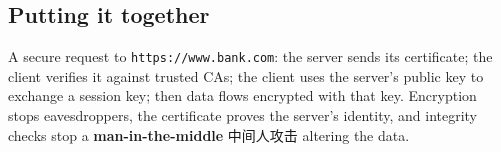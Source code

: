 \documentclass[11pt]{article}
\begin{document}
\subsection*{Putting it together}

A secure request to \texttt{https://www.bank.com}: the server sends its certificate; the client verifies it against trusted CAs; the client uses the server's public key to exchange a session key; then data flows encrypted with that key. Encryption stops eavesdroppers, the certificate proves the server's identity, and integrity checks stop a \textbf{man-in-the-middle} 中间人攻击 altering the data.
\end{document}
